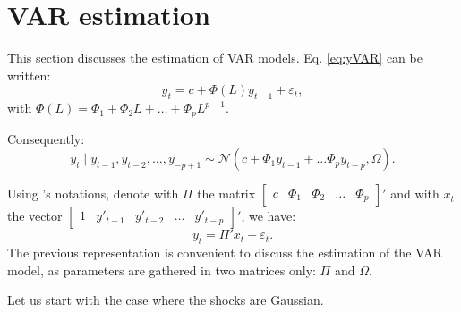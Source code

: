\documentclass[
  12pt,
]{book}
\theoremstyle{definition}
\theoremstyle{definition}
\theoremstyle{definition}
\theoremstyle{definition}
\theoremstyle{remark}
\begin{document}
\hypertarget{estimVAR}{%
\section{VAR estimation}\label{estimVAR}}

This section discusses the estimation of VAR models. Eq. \eqref{eq:yVAR} can be written:
\[
y_{t}=c+\Phi(L)y_{t-1}+\varepsilon_{t},
\]
with \(\Phi(L) = \Phi_1 + \Phi_2 L + \dots + \Phi_p L^{p-1}\).

Consequently:
\[
y_{t}\mid y_{t-1},y_{t-2},\ldots,y_{-p+1}\sim \mathcal{N}(c+\Phi_{1}y_{t-1}+\ldots\Phi_{p}y_{t-p},\Omega).
\]

Using \citet{Hamilton_1994}'s notations, denote with \(\Pi\) the matrix \(\left[\begin{array}{ccccc} c & \Phi_{1} & \Phi_{2} & \ldots & \Phi_{p}\end{array}\right]'\) and with \(x_{t}\) the vector \(\left[\begin{array}{ccccc} 1 & y'_{t-1} & y'_{t-2} & \ldots & y'_{t-p}\end{array}\right]'\), we have:
\begin{equation}
y_{t}= \Pi'x_{t} + \varepsilon_{t}. \label{eq:PIVAR}
\end{equation}
The previous representation is convenient to discuss the estimation of the VAR model, as parameters are gathered in two matrices only: \(\Pi\) and \(\Omega\).

Let us start with the case where the shocks are Gaussian.
\end{document}
